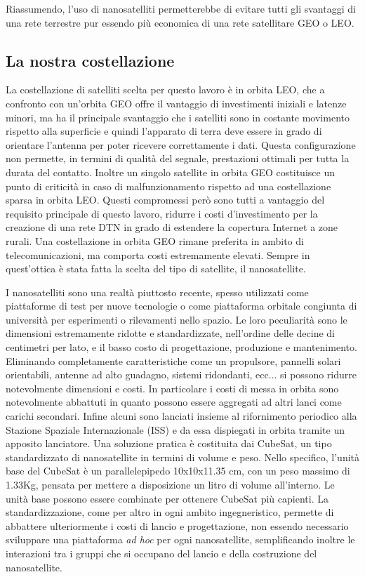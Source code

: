 \documentclass[12pt,a4paper,oneside]{book}
\begin{document}
		Riassumendo, l'uso di nanosatelliti permetterebbe di evitare tutti gli svantaggi di una rete terrestre pur essendo più economica di una rete satellitare GEO o LEO. 
		
		\subsection{La nostra costellazione} \label{nostrCostell}
		La costellazione di satelliti scelta per questo lavoro è in orbita LEO, che a confronto con un'orbita GEO offre il vantaggio di investimenti iniziali e latenze minori, ma ha il principale svantaggio che i satelliti sono in costante movimento rispetto alla superficie e quindi l'apparato di terra deve essere in grado di orientare l'antenna per poter ricevere correttamente i dati. Questa configurazione non permette, in termini di qualità del segnale, prestazioni ottimali per tutta la durata del contatto. Inoltre un singolo satellite in orbita GEO costituisce un punto di criticità in caso di malfunzionamento rispetto ad una costellazione sparsa in orbita LEO. Questi compromessi però sono tutti a vantaggio del requisito principale di questo lavoro, ridurre i costi d'investimento per la creazione di una rete DTN in grado di estendere la copertura Internet a zone rurali. Una costellazione in orbita GEO rimane preferita in ambito di telecomunicazioni, ma comporta costi estremamente elevati. Sempre in quest'ottica è stata fatta la scelta del tipo di satellite, il nanosatellite.
		
		I nanosatelliti sono una realtà piuttosto recente, spesso utilizzati come piattaforme di test per nuove tecnologie o come piattaforma orbitale congiunta di università per esperimenti o rilevamenti nello spazio. Le loro peculiarità sono le dimensioni estremamente ridotte e standardizzate, nell'ordine delle decine di centimetri per lato, e il basso costo di progettazione, produzione e mantenimento. Eliminando completamente caratteristiche come un propulsore, pannelli solari orientabili, antenne ad alto guadagno, sistemi ridondanti, ecc... si possono ridurre notevolmente dimensioni e costi. In particolare i costi di messa in orbita sono notevolmente abbattuti in quanto possono essere aggregati ad altri lanci come carichi secondari. Infine alcuni sono lanciati insieme al rifornimento periodico alla Stazione Spaziale Internazionale (ISS) e da essa dispiegati in orbita tramite un apposito lanciatore. 
		Una soluzione pratica è costituita dai CubeSat, un tipo standardizzato di nanosatellite in termini di volume e peso. Nello specifico, l'unità base del CubeSat è un parallelepipedo 10x10x11.35 cm, con un peso massimo di 1.33Kg, pensata per mettere a disposizione un litro di volume all'interno. Le unità base possono essere combinate per ottenere CubeSat più capienti. La standardizzazione, come per altro in ogni ambito ingegneristico, permette di abbattere ulteriormente i costi di lancio e progettazione, non essendo necessario sviluppare una piattaforma \textit{ad hoc} per ogni nanosatellite, semplificando inoltre le interazioni tra i gruppi che si occupano del lancio e della costruzione del nanosatellite.
		
\end{document}

